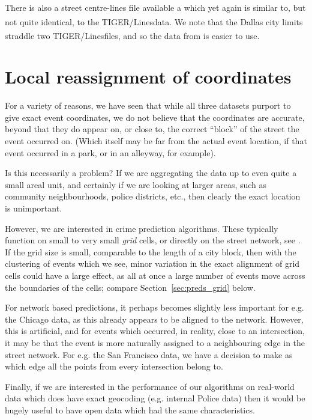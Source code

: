 \documentclass[twoside,a4paper,twocolumn,10pt]{article}
\theoremstyle{plain}
\theoremstyle{definition}
\newcommand{\regsym}{\textsuperscript{\textregistered}}
\begin{document}
There is also a street centre-lines file available a \cite{dstreets} which yet again is similar
to, but not quite identical, to the TIGER/Lines\regsym data.  We note that the Dallas city
limits straddle two TIGER/Lines\regsym files, and so the data from \cite{dstreets} is easier to use.



\section{Local reassignment of coordinates}\label{sec:reassign}

For a variety of reasons, we have seen that while all three datasets purport to give
exact event coordinates, we do not believe that the coordinates are accurate, beyond
that they do appear on, or close to, the correct ``block'' of the street the event
occurred on.  (Which itself may be far from the actual event location, if that
event occurred in a park, or in an alleyway, for example).

Is this necessarily a problem?  If we are aggregating the data up to even quite a small
areal unit, and certainly if we are looking at larger areas, such as community
neighbourhoods, police districts, etc., then clearly the exact location is unimportant.

However, we are interested in crime prediction algorithms.  These typically function
on small to very small \emph{grid} cells, or directly on the street network, see
\cite{arc, bjp, rand, rosser_sepp, rosser_nw}.
If the grid size is small, comparable to the length of a city block, then with the
clustering of events which we see, minor variation in the exact alignment of
grid cells could have a large effect, as all at once a large number of events move
across the boundaries of the cells; compare Section~\ref{sec:preds_grid} below.

For network based predictions, it perhaps becomes slightly less important for
e.g. the Chicago data, as this already appears to be aligned to the network.
However, this is artificial, and for events which occurred, in reality, close
to an intersection, it may be that the event is more naturally assigned to a
neighbouring edge in the street network.  For e.g. the San Francisco data, we
have a decision to make as which edge all the points from every intersection
belong to.

Finally, if we are interested in the performance of our algorithms on real-world data
which does have exact geocoding (e.g. internal Police data) then it would be hugely
useful to have open data which had the same characteristics.
\end{document}
